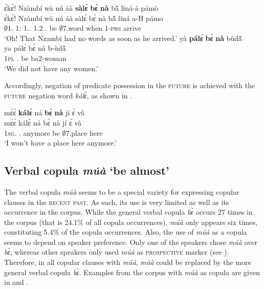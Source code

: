 \ea \label{besale}
  \glll ɛ́kɛ̀! Nzàmbí wà nú áà {\bfseries sàlɛ́} {\bfseries bɛ̀} {\bfseries nà} bã̂ líná-á pámò \\
      ɛ́kɛ̀! Nzàmbí wà nú áà sàlɛ́ bɛ̀ nà bã̂ líná a-H pámo\\
        {\EXCL} $\emptyset$1.{\PN} 1:{\ATT} 1.{\DEM}.{\DIST} 1.{\PST}2 {\NEG}.{\PST} be {\COM} $\emptyset$7.word when 1-\textsc{prs} arrive\\
    \trans `Oh! That Nzambi had no words as soon as he arrived.'
\ex \label{bepale}
  \glll  yà {\bfseries pálɛ́} {\bfseries bɛ̀} {\bfseries nà} bùdã̂ \\
      ya pálɛ́ bɛ̀ nà b-ùdã̂ \\
        1\textsc{pl} {\NEG}.{\PST} be {\COM} ba2-woman\\
    \trans `We did not have any women.'
\z

\noindent Accordingly, negation of predicate possession in the \textsc{future} is achieved with the \textsc{future} negation word {\itshape kálɛ̀}, as shown in .


\ea \label{bekale}
  \glll  mɛ̀ɛ̀ {\bfseries kálɛ̀} ná {\bfseries bɛ̀} {\bfseries nà} jí ɛ́ vâ \\
        mɛ̀ɛ̀ kálɛ̀ ná bɛ̀ nà jí ɛ́ vâ \\
           1\textsc{sg}.{\FUT} {\NEG}.{\FUT} anymore be {\COM} $\emptyset$7.place {\LOC} here\\
    \trans `I won't have a place here anymore.'
\z









\subsection{Verbal copula {\itshape múà} `be almost'}
\label{sec:COPmua}

The verbal copula {\itshape múà} seems to be a special variety for expressing copular clauses in the \textsc{recent past}. As such, its use is very limited as well as its occurrence in the corpus. While the general verbal copula {\itshape bɛ̀} occurs 27 times in the corpus (that is 24.1\% of all copula occurrences), {\itshape múà} only appears six times, constituting 5.4\% of the copula occurrences.  Also, the use of {\itshape múà} as a copula seems to depend on speaker preference. Only one of the speakers chose {\itshape múà} over {\itshape bɛ̀}, whereas other speakers only used {\itshape múà} as \textsc{prospective} marker (see ). Therefore, in all copular clauses with {\itshape múà}, {\itshape múà} could be replaced by the more general verbal copula {\itshape bɛ̀}. Examples from the corpus with {\itshape múà} as copula are given in  and .


